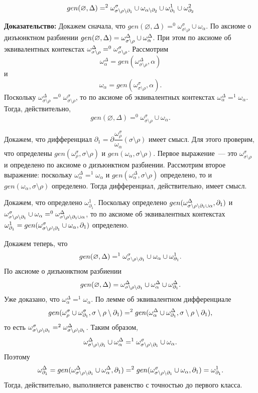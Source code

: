 $$gen(\varnothing, \Delta) =^2 \omega^\sigma_{{\sigma\setminus\rho\setminus\partial_1}} \cup \omega_{{\alpha\setminus{\partial_2}}} \cup \omega^1_{\partial_1} \cup \omega^2_{\partial_2}$$

\textbf{Доказательство:}
Докажем сначала, что $gen(\varnothing, \Delta) =^0 \omega^\sigma_{\sigma\setminus\rho} \cup \omega_\alpha$. По аксиоме о дизъюнктном разбиении $gen(\varnothing, \Delta) = \omega^\Delta_{\sigma\setminus\rho} \cup \omega^\Delta_\alpha$. При этом по аксиоме об эквивалентных контекстах $\omega^\Delta_{\sigma\setminus\rho} =^0 \omega^\sigma_{\sigma\setminus\rho}$. Рассмотрим $$\omega^\Delta_\alpha = gen(\omega^\Delta_{\sigma\setminus\rho}, \alpha)$$ 
и $$\omega_\alpha = gen(\omega^\sigma_{\sigma\setminus\rho}, \alpha).$$ 
Поскольку $\omega^\Delta_{\sigma\setminus\rho} =^0 \omega^\sigma_{\sigma\setminus\rho}$, то по аксиоме об эквивалентных контекстах $\omega^\Delta_\alpha =^1 \omega_\alpha$. Тогда, действительно, $$gen(\varnothing, \Delta) =^0 \omega^\sigma_{\sigma\setminus\rho} \cup \omega_\alpha.$$ 

Докажем, что дифференциал $\partial_1 = \partial\dfrac{\omega^\sigma_\rho}{\omega_\alpha}(\sigma\setminus\rho)$ имеет смысл. Для этого проверим, что определены $gen(\omega^\sigma_\rho, \sigma\setminus\rho)$ и $gen(\omega_\alpha, \sigma\setminus\rho)$. Первое выражение~--- это $\omega^\sigma_{\sigma\setminus\rho}$ и определено по аксиоме о дизъюнктном разбиении. Рассмотрим второе выражение: поскольку $\omega^\Delta_\alpha =^1 \omega_\alpha$ и $gen(\omega^\Delta_\alpha, \sigma\setminus\rho)$ определено, то и $gen(\omega_\alpha, \sigma\setminus\rho)$ определено. Тогда дифференциал, действительно, имеет смысл.

Докажем, что определено $\omega^1_{\partial_1}$. Поскольку определено $gen(\omega^\Delta_{{\sigma\setminus\rho\setminus\partial_1} \cup \alpha}, \partial_1)$ и $\omega^\sigma_{{\sigma\setminus\rho\setminus\partial_1}} \cup \omega_\alpha =^0 \omega^\Delta_{{\sigma\setminus\rho\setminus\partial_1} \cup \alpha}$, то по аксиоме об эквивалентных контекстах $\omega^1_{\partial_1} = gen(\omega^\sigma_{{\sigma\setminus\rho\setminus\partial_1}} \cup \omega_\alpha, \partial_1)$ определено.

Докажем теперь, что $$gen(\varnothing, \Delta) =^1 \omega^\sigma_{{\sigma\setminus\rho\setminus\partial_1}} \cup \omega_\alpha \cup \omega^1_{\partial_1}.$$ 
По аксиоме о дизъюнктном разбиении $$gen(\varnothing, \Delta) = \omega^\Delta_{\sigma\setminus\rho\setminus\partial_1} \cup \omega^\Delta_\alpha \cup \omega^\Delta_{\partial_1}.$$ 
Уже доказано, что $\omega^\Delta_\alpha =^1 \omega_\alpha$. По лемме об эквивалентном дифференциале $$gen(\omega^\sigma_\rho \cup \omega^\sigma_{\partial_1}, {\sigma\setminus\rho\setminus\partial_1}) =^2 gen(\omega^\Delta_\alpha \cup \omega^\Delta_{\partial_1}, {\sigma\setminus\rho\setminus\partial_1}),$$ 
то есть $\omega^\sigma_{{\sigma\setminus\rho\setminus\partial_1}} =^2 \omega^\Delta_{{\sigma\setminus\rho\setminus\partial_1}}$. Таким образом, $$\omega^\Delta_{\sigma\setminus\rho\setminus\partial_1} \cup \omega^\Delta_\alpha =^1 \omega^\sigma_{{\sigma\setminus\rho\setminus\partial_1}} \cup \omega_\alpha.$$ 
Поэтому $$\omega^\Delta_{\partial_1} = gen(\omega^\Delta_{\sigma\setminus\rho\setminus\partial_1} \cup \omega^\Delta_\alpha, \partial_1) =^2 gen(\omega^\sigma_{{\sigma\setminus\rho\setminus\partial_1}} \cup \omega_\alpha, \partial_1) = \omega^1_{\partial_1}.$$ Тогда, действительно, выполняется равенство с точностью до первого класса.

